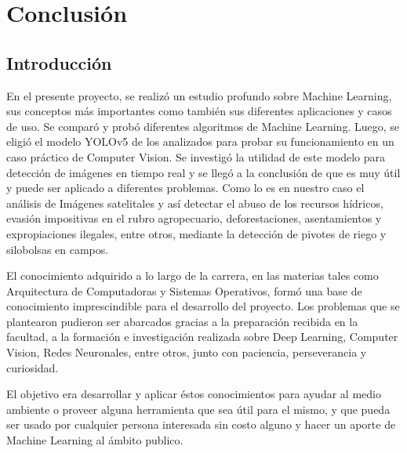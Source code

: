 \chapter{Conclusión}
\label{Conclusión}
\section{Introducción}

En el presente proyecto, se realizó un estudio profundo sobre Machine Learning, sus conceptos más importantes como también sus diferentes aplicaciones y casos de uso. Se comparó y probó diferentes algoritmos de Machine Learning. Luego, se eligió el modelo YOLOv5 de los analizados para probar su funcionamiento en un caso práctico de Computer Vision. Se investigó la utilidad de este modelo para detección de imágenes en tiempo real y se llegó a la conclusión de que es muy útil y puede ser aplicado a diferentes problemas. Como lo es en nuestro caso el análisis de Imágenes satelitales y así detectar el abuso de los recursos hídricos, evasión impositivas en el rubro agropecuario, deforestaciones, asentamientos y expropiaciones ilegales, entre otros, mediante la detección de pivotes de riego y silobolsas en campos.

El conocimiento adquirido a lo largo de la carrera, en las materias tales como Arquitectura de Computadoras y Sistemas Operativos, formó una base de conocimiento imprescindible para el desarrollo del proyecto. Los problemas que se plantearon pudieron ser abarcados gracias a la preparación recibida en la facultad, a la formación e investigación realizada sobre Deep Learning, Computer Vision, Redes Neuronales, entre otros, junto con paciencia, perseverancia y curiosidad.

El objetivo era desarrollar y aplicar éstos conocimientos para ayudar al medio ambiente o proveer alguna herramienta que sea útil para el mismo, y que pueda ser usado por cualquier persona interesada sin costo alguno y hacer un aporte de Machine Learning al ámbito publico. 

